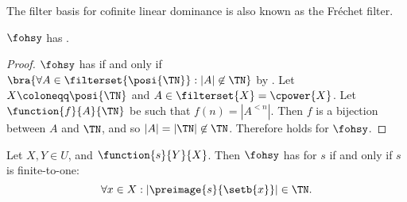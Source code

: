 \documentclass[b5paper, english, oneside]{memoir}
\begin{document}
\begin{note}
The filter basis for cofinite linear dominance is also known as the Fr\'echet filter.
\end{note}

\begin{theorem}
\label{CofiniteOneSeparation}
$\fohsy$ has .
\end{theorem}

\begin{proof}
$\fohsy$ has  if and only if $\bra{\forall A \in \filterset{\posi{\TN}} : |A| \not\in \TN}$ by . Let $X \coloneqq \posi{\TN}$ and $A \in \filterset{X} = \cpower{X}$. Let $\function{f}{A}{\TN}$ be such that $f(n) = |A^{< n}|$. Then $f$ is a bijection between $A$ and $\TN$, and so $|A| = |\TN| \not\in \TN$. Therefore  holds for $\fohsy$.
\end{proof}

\begin{theorem}
\label{CofiniteCompositionForFixedS}
Let $X, Y \in U$, and $\function{s}{Y}{X}$. Then $\fohsy$ has  for $s$ if and only if $s$ is finite-to-one:
\begin{equation}
\forall x \in X: |\preimage{s}{\setb{x}}| \in \TN.
\end{equation}
\end{theorem}
\end{document}
